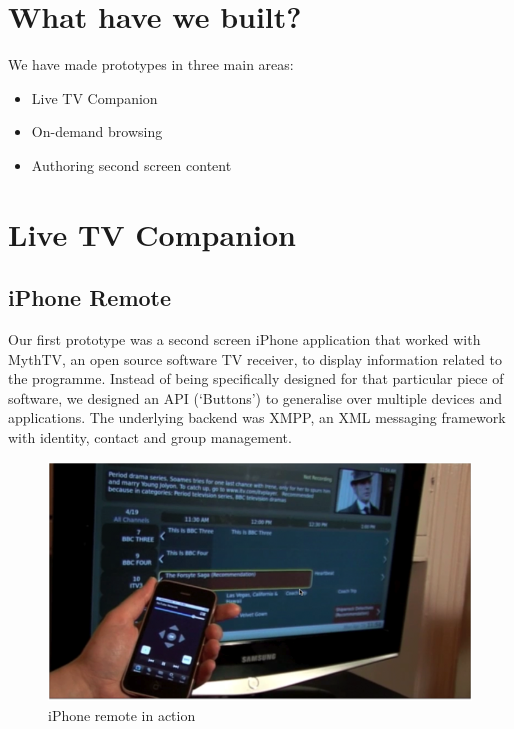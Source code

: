 \documentclass{notube}
\begin{document}
\section{What have we built?}

We have made prototypes in three main areas:

\begin{itemize}
\item{Live TV Companion}
\item{On-demand browsing}
\item{Authoring second screen content}
\end{itemize}

\section{Live TV Companion}

\subsection{iPhone Remote}

Our first prototype was a second screen iPhone application that worked with MythTV, an open source software TV receiver, to display information related to the programme. Instead of being specifically designed for that particular piece of software, we designed an API (`Buttons') to generalise over multiple devices and applications. The underlying backend was XMPP, an XML messaging framework with identity, contact and group management. 

\begin{figure}[htbp]
\begin{center}
\includegraphics[width=6in]{images/year1.png}
\caption{iPhone remote in action} \label{fig:year1}
\end{center}
\end{figure} 
\end{document}
